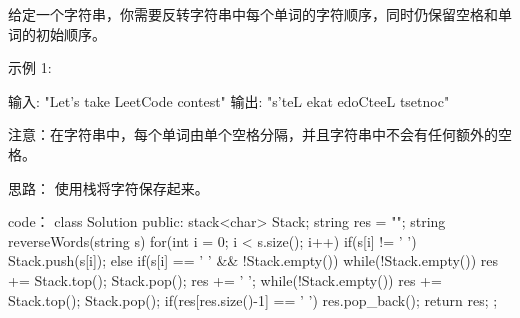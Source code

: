 给定一个字符串，你需要反转字符串中每个单词的字符顺序，同时仍保留空格和单词的初始顺序。

示例 1:

输入: "Let's take LeetCode contest"
输出: "s'teL ekat edoCteeL tsetnoc" 

注意：在字符串中，每个单词由单个空格分隔，并且字符串中不会有任何额外的空格。

























思路：
使用栈将字符保存起来。
















code：
class Solution {
public:
    stack<char> Stack;
    string res = "";
    string reverseWords(string s) {
        for(int i = 0; i < s.size(); i++)
        {
            if(s[i] != ' ')
                Stack.push(s[i]);
            else if(s[i] == ' ' && !Stack.empty())
            {
                while(!Stack.empty())
                {
                    res += Stack.top(); Stack.pop();
                }
                res += ' ';
            }
        }
        while(!Stack.empty())
        {
            res += Stack.top(); Stack.pop();
        }
        if(res[res.size()-1] == ' ') res.pop_back();
        return res;
    }
};